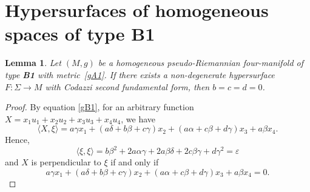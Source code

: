 \documentclass{amsart}
\theoremstyle{plain}
\newtheorem{lemma}{Lemma}
\newtheorem{corollary}{Corollary}
\theoremstyle{remark}
\begin{document}
{%


\section{Hypersurfaces of homogeneous spaces of type \textbf{B1}}
\setcounter{equation}{0}

\begin{lemma} \label{necB1}
Let $(M,g)$ be a homogeneous pseudo-Riemannian four-manifold of type {\rm\bf B1} with metric~\eqref{gA1}. If there exists a non-degenerate hypersurface $F : \Sigma \to M$ with Codazzi second fundamental form, then $b=c=d=0$.
\end{lemma}
\begin{proof} By equation \eqref{gB1}, for an arbitrary function $X=x_1u_1+x_2u_2+x_3u_3+x_4u_4$, we have 
%
\[
\langle X,\xi\rangle=a\gamma x_1+(a \delta +b\beta +c\gamma ) x_2+(a \alpha +c\beta +d\gamma )x_3+a \beta x_4.
\]
%
Hence,
\begin{equation*}\label{nxiB1}
\langle \xi,\xi\rangle=b\beta^2 +2a\alpha \gamma +2a\beta\delta +2c\beta \gamma +d\gamma^2 = \varepsilon
\end{equation*}
%
and $X$ is perpendicular to $\xi$ if and only if 
%
\[
a\gamma x_1+(a \delta +b\beta +c\gamma ) x_2+(a \alpha +c\beta +d\gamma )x_3+a \beta x_4=0.
\]
%


\end{proof}}
\end{document}
